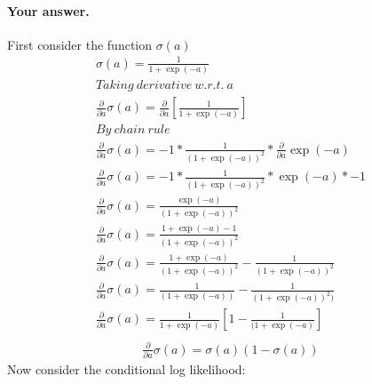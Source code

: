 \documentclass[11pt]{scrartcl}
\begin{document}
	\paragraph{Your answer.}
	First consider the function $\sigma(a)$\\
	\begin{gather*}
	\sigma(a) = \frac{1}{1 +\exp(-a)}\\
	Taking\ derivative\ w.r.t.\ a\\
	\frac{\partial }{\partial a}\sigma(a) = \frac{\partial }{\partial a}[\frac{1}{1 +\exp(-a)}]\\
	By\ chain\ rule\\
	\frac{\partial }{\partial a}\sigma(a) = -1 * \frac{1}{(1+\exp(-a))^{2}} * \frac{\partial }{\partial a}\exp(-a)\\
	\frac{\partial }{\partial a}\sigma(a) = -1 * \frac{1}{(1+\exp(-a))^{2}} * \exp(-a) * -1\\
	\frac{\partial }{\partial a}\sigma(a) = \frac{\exp(-a)}{(1+\exp(-a))^{2}}\\
	\frac{\partial }{\partial a}\sigma(a) = \frac{1+\exp(-a)-1}{(1+\exp(-a))^{2}}\\
	\frac{\partial }{\partial a}\sigma(a) = \frac{1+\exp(-a)}{(1+\exp(-a))^{2}} - \frac{1}{(1+\exp(-a))^{2}}\\
	\frac{\partial }{\partial a}\sigma(a) = \frac{1}{(1+\exp(-a))} - \frac{1}{(1+\exp(-a))^{2})}\\
	\frac{\partial }{\partial a}\sigma(a) = \frac{1}{1+\exp(-a)}[1 - \frac{1}{(1+\exp(-a)}]\\
	\end{gather*}
	\begin{gather}
	\frac{\partial }{\partial a}\sigma(a) = \sigma(a)(1-\sigma(a))
	\end{gather}
	Now consider the conditional log likelihood:
\end{document}
